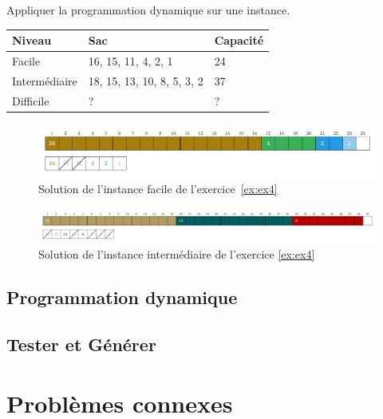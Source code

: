 \documentclass[11pt]{article}
\begin{document}
    \begin{exercice}{}
    \label{ex:ex4}
    Appliquer la programmation dynamique sur une instance.\\
    \begin{tabular}{lll}
      \toprule
      Niveau & Sac & Capacité \\
      \midrule
      Facile & 16, 15, 11, 4, 2, 1 & 24 \\
      Intermédiaire & 18, 15, 13, 10, 8, 5, 3, 2 & 37 \\
      Difficile & ? & ? \\
      \bottomrule
      \end{tabular}
    \end{exercice}


    \begin{figure}[htbp]
    \centering
    \includegraphics[width=0.6\linewidth]{ex4-6-DP.pdf}
    \caption{Solution de l'instance facile de l'exercice~\ref{ex:ex4}}
  \end{figure}

  \begin{figure}[htbp]
    \centering
    \includegraphics[width=0.6\linewidth]{ex4-8-DP.pdf}
    \caption{Solution de l'instance intermédiaire de l'exercice \ref{ex:ex4}}
  \end{figure}


  \subsection{Programmation dynamique}

  \subsection{Tester et Générer}

  \appendix
  \section{Problèmes connexes}

\end{document}

